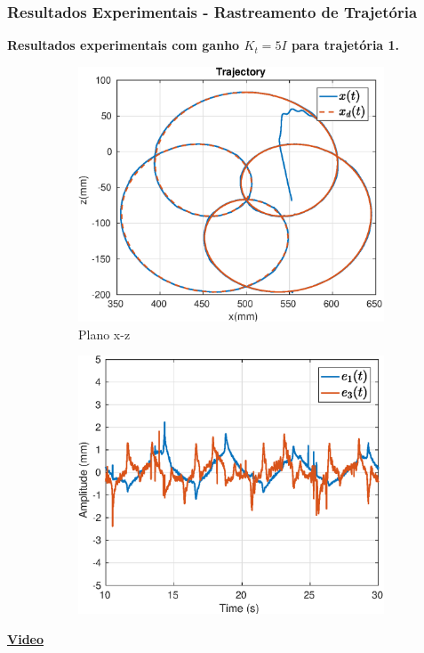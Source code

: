 \documentclass{beamer}
\begin{document}
\begin{frame}
\frametitle{Resultados Experimentais - Rastreamento de Trajetória}
\textbf{Resultados experimentais com ganho $K_t = 5 I$ para trajetória 1.}
\begin{figure}[H]
\centering
\begin{subfigure}{.5\textwidth}
  \centering
  \includegraphics[width=\linewidth]{./img/traj_1_k5/traj.eps}
  \caption{Plano x-z}
\end{subfigure}%
\begin{subfigure}{.5\textwidth}
  \centering
  \includegraphics[width=\linewidth]{./img/traj_1_k5/error.eps}
\end{subfigure}
\end{figure}%
\begin{center}
\href{run:./videos/traj1.mp4}{\textbf{Video}}%
\end{center}
\end{frame}
\end{document}
